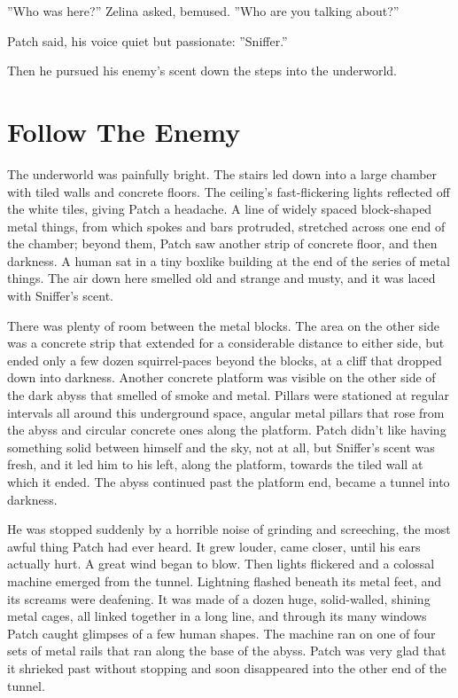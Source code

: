 \documentclass[12pt]{book}
\begin{document}
''Who was here?'' Zelina asked, bemused. ''Who are you talking about?''

Patch said, his voice quiet but passionate: ''Sniffer.''

Then he pursued his enemy's scent down the steps into the underworld.


\section{Follow The Enemy}

The underworld was painfully bright. The stairs led down into a large chamber with tiled walls and concrete floors. The ceiling's fast-flickering lights reflected off the white tiles, giving Patch a headache. A line of widely spaced block-shaped metal things, from which spokes and bars protruded, stretched across one end of the chamber; beyond them, Patch saw another strip of concrete floor, and then darkness. A human sat in a tiny boxlike building at the end of the series of metal things. The air down here smelled old and strange and musty, and it was laced with Sniffer's scent.

There was plenty of room between the metal blocks. The area on the other side was a concrete strip that extended for a considerable distance to either side, but ended only a few dozen squirrel-paces beyond the blocks, at a cliff that dropped down into darkness. Another concrete platform was visible on the other side of the dark abyss that smelled of smoke and metal. Pillars were stationed at regular intervals all around this underground space, angular metal pillars that rose from the abyss and circular concrete ones along the platform. Patch didn't like having something solid between himself and the sky, not at all, but Sniffer's scent was fresh, and it led him to his left, along the platform, towards the tiled wall at which it ended. The abyss continued past the platform end, became a tunnel into darkness.

He was stopped suddenly by a horrible noise of grinding and screeching, the most awful thing Patch had ever heard. It grew louder, came closer, until his ears actually hurt. A great wind began to blow. Then lights flickered and a colossal machine emerged from the tunnel. Lightning flashed beneath its metal feet, and its screams were deafening. It was made of a dozen huge, solid-walled, shining metal cages, all linked together in a long line, and through its many windows Patch caught glimpses of a few human shapes. The machine ran on one of four sets of metal rails that ran along the base of the abyss. Patch was very glad that it shrieked past without stopping and soon disappeared into the other end of the tunnel.
\end{document}
